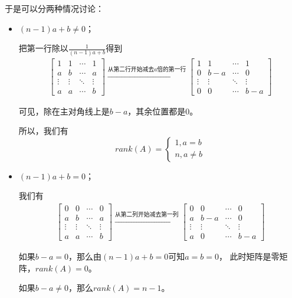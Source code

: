 \documentclass{article}
\begin{document}
于是可以分两种情况讨论：
\begin{itemize}
  \item $(n - 1)a + b \neq 0$；

        把第一行除以$\frac{1}{(n - 1)a + b}$得到
        \begin{align*}
          \begin{bmatrix}
            1      & 1      & \cdots & 1      \\
            a      & b      & \cdots & a      \\
            \vdots & \vdots & \ddots & \vdots \\
            a      & a      & \cdots & b
          \end{bmatrix}
          \xrightarrow{\text{从第二行开始减去$a$倍的第一行}}
          \begin{bmatrix}
            1      & 1      & \cdots & 1      \\
            0      & b - a  & \cdots & 0      \\
            \vdots & \vdots & \ddots & \vdots \\
            0      & 0      & \cdots & b - a
          \end{bmatrix}
        \end{align*}

        可见，除在主对角线上是$b - a$，其余位置都是$0$。

        所以，我们有
        \begin{equation*}
          rank(A) =
          \begin{cases*}
            1, a = b \\
            n, a \neq b
          \end{cases*}
        \end{equation*}

  \item $(n - 1)a + b = 0$；

        我们有
        \begin{align*}
          \begin{bmatrix}
            0      & 0      & \cdots & 0      \\
            a      & b      & \cdots & a      \\
            \vdots & \vdots & \ddots & \vdots \\
            a      & a      & \cdots & b
          \end{bmatrix}
          \xrightarrow{\text{从第二列开始减去第一列}}
          \begin{bmatrix}
            0      & 0      & \cdots & 0      \\
            a      & b - a  & \cdots & 0      \\
            \vdots & \vdots & \ddots & \vdots \\
            a      & 0      & \cdots & b - a
          \end{bmatrix}
        \end{align*}

        如果$b - a = 0$，那么由$(n - 1)a + b = 0$可知$a = b = 0$，
        此时矩阵是零矩阵，$rank(A) = 0$。

        如果$b - a \neq 0$，那么$rank(A) = n - 1$。
\end{itemize}
\end{document}
